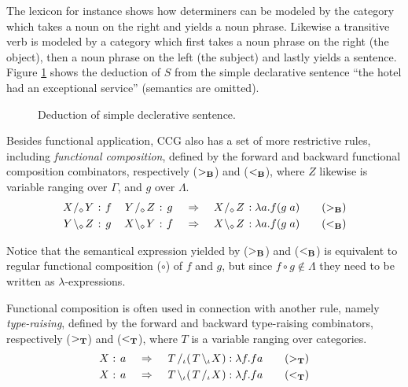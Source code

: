 The lexicon for instance shows how determiners can be modeled by the category which takes a noun on the right and yields a noun phrase. Likewise a transitive verb is modeled by a category which first takes a noun phrase on the right (the object), then a noun phrase on the left (the subject) and lastly yields a sentence. Figure \ref{fig:simpleSentence} shows the deduction of $S$ from the simple declarative sentence ``the hotel had an exceptional service'' (semantics are omitted).
\vfill
\begin{figure}[ht]
\center
{}
\caption{Deduction of simple declerative sentence.}
\label{fig:simpleSentence}
\end{figure}
\vfill
\clearpage

Besides functional application, CCG also has a set of more restrictive rules, including \emph{functional composition}, defined by the forward and backward functional composition combinators, respectively (${>_{\bf B}}$) and (${<_{\bf B}}$), where $Z$ likewise is variable ranging over $\Gamma$, and $g$ over $\Lambda$.
\begin{align*}
  \catvar{X}   /_\diamond  \catvar{Y} : \fvar{f} \quad \catvar{Y}  /_\diamond   \catvar{Z} : \fvar{g}
  &\quad\Rightarrow\quad
  \catvar{X}   /_\diamond  \catvar{Z} : \lambda a . f ( g \; a)
  \tag{${>_{\bf B}}$} \\
  \catvar{Y} \bsl_\diamond \catvar{Z} : \fvar{g} \quad \catvar{X} \bsl_\diamond \catvar{Y} : \fvar{f} 
  &\quad\Rightarrow\quad
  \catvar{X} \bsl_\diamond \catvar{Z} : \lambda a . f ( g \; a)
  \tag{${<_{\bf B}}$}
\end{align*}
\vspace{-1.5em}

Notice that the semantical expression yielded by (${>_{\bf B}}$) and (${<_{\bf B}}$) is equivalent to regular functional composition ($\circ$) of $f$ and $g$, but since $f \circ g \not \in \Lambda$ they need to be written as $\lambda$-expressions.

Functional composition is often used in connection with another rule, namely \emph{type-raising}, defined by the forward and backward type-raising combinators, respectively (${>_{\bf T}}$) and (${<_{\bf T}}$), where $T$ is a variable ranging over categories.
\begin{align*}
  \catvar{X} : \fvar{a}
  &\quad\Rightarrow\quad
  \catvar{T}/_\iota ( \catvar{T} \bsl_\iota \catvar{X} ) : \lambda f . f a
  \tag{$>_\mathbf{T}$} \\
  \catvar{X} : \fvar{a}
  &\quad\Rightarrow\quad
  \catvar{T}\bsl_\iota ( \catvar{T} /_\iota \catvar{X} ) : \lambda f . f a
  \tag{$<_\mathbf{T}$}
\end{align*}
\vspace{-1.5em}


